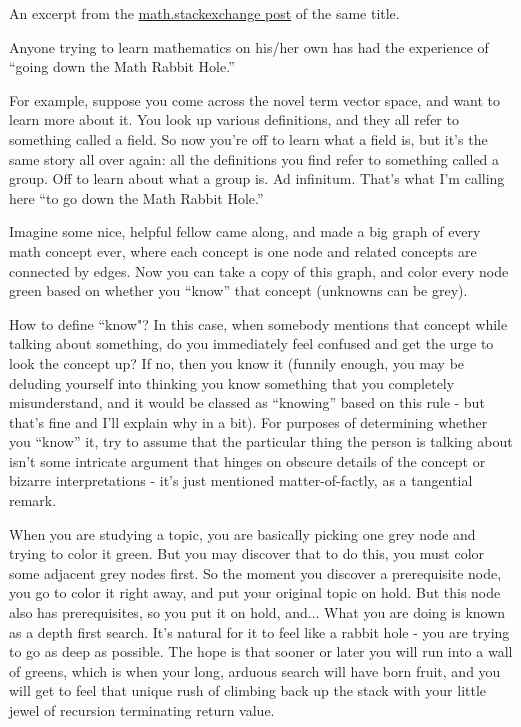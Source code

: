 An excerpt from the
\href{https://math.stackexchange.com/questions/617625/on-familiarity-or-how-to-avoid-going-down-the-math-rabbit-hole}{math.stackexchange
post} of the same title.

Anyone trying to learn mathematics on his/her own has had the experience of ``going down
the Math Rabbit Hole.''

For example, suppose you come across the novel term vector space, and want to learn more
about it. You look up various definitions, and they all refer to something called a field.
So now you're off to learn what a field is, but it's the same story all over again: all
the definitions you find refer to something called a group. Off to learn about what a
group is. Ad infinitum. That's what I'm calling here ``to go down the Math Rabbit Hole.''

Imagine some nice, helpful fellow came along, and made a big graph of every math concept
ever, where each concept is one node and related concepts are connected by edges. Now you
can take a copy of this graph, and color every node green based on whether you ``know''
that concept (unknowns can be grey).

How to define ``know"? In this case, when somebody mentions that concept while talking
about something, do you immediately feel confused and get the urge to look the concept up?
If no, then you know it (funnily enough, you may be deluding yourself into thinking you
know something that you completely misunderstand, and it would be classed as ``knowing''
based on this rule - but that's fine and I'll explain why in a bit). For purposes of
determining whether you ``know'' it, try to assume that the particular thing the person is
talking about isn't some intricate argument that hinges on obscure details of the concept
or bizarre interpretations - it's just mentioned matter-of-factly, as a tangential remark.

When you are studying a topic, you are basically picking one grey node and trying to color
it green. But you may discover that to do this, you must color some adjacent grey nodes
first. So the moment you discover a prerequisite node, you go to color it right away, and
put your original topic on hold. But this node also has prerequisites, so you put it on
hold, and... What you are doing is known as a depth first search. It's natural for it to
feel like a rabbit hole - you are trying to go as deep as possible. The hope is that
sooner or later you will run into a wall of greens, which is when your long, arduous
search will have born fruit, and you will get to feel that unique rush of climbing back up
the stack with your little jewel of recursion terminating return value.

